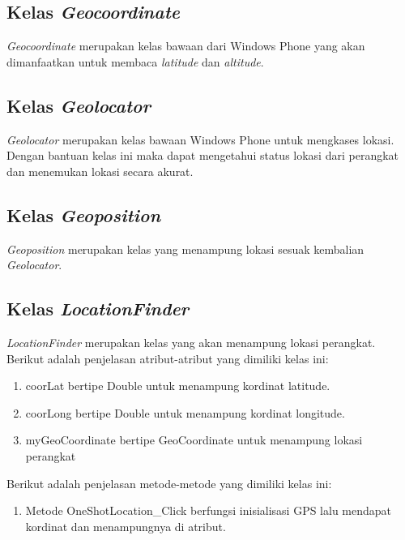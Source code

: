 \subsection{Kelas \textit{Geocoordinate}}
\label{lab:Kelas Geocoordinate}
\hspace{0.5cm} \textit{Geocoordinate} merupakan kelas bawaan dari Windows Phone yang akan dimanfaatkan untuk membaca \textit{latitude} dan \textit{altitude}.

\subsection{Kelas \textit{Geolocator}}
\label{lab:Kelas Geolocator}
\hspace{0.5cm} \textit{Geolocator} merupakan kelas bawaan Windows Phone untuk mengkases lokasi. Dengan bantuan kelas ini maka dapat mengetahui status lokasi dari perangkat dan menemukan lokasi secara akurat.

\subsection{Kelas \textit{Geoposition}}
\label{lab:Kelas Geoposition}
\hspace{0.5cm} \textit{Geoposition} merupakan kelas yang menampung lokasi sesuak kembalian \textit{Geolocator}.

\subsection{Kelas \textit{LocationFinder}}
\label{lab:Kelas LocationFinder}
\hspace{0.5cm} \textit{LocationFinder} merupakan kelas yang akan menampung lokasi perangkat. Berikut adalah penjelasan atribut-atribut yang dimiliki kelas ini:
\begin{enumerate}
	\item coorLat bertipe Double untuk menampung kordinat latitude.
	\item coorLong bertipe Double untuk menampung kordinat longitude.
	\item myGeoCoordinate bertipe GeoCoordinate untuk menampung lokasi perangkat
\end{enumerate}

Berikut adalah penjelasan metode-metode yang dimiliki kelas ini:
\begin{enumerate}
	\item Metode OneShotLocation\_Click berfungsi inisialisasi GPS lalu mendapat kordinat dan menampungnya di atribut.
\end{enumerate}

